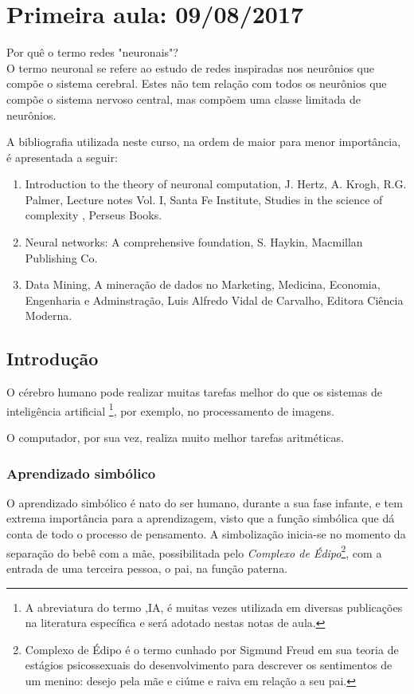 \section{Primeira aula: 09/08/2017 }
\onehalfspacing

Por quê o termo redes "neuronais"?\\
O termo neuronal se refere ao estudo de redes inspiradas nos neurônios que compõe o sistema cerebral.  Estes não tem relação com todos os neurônios que compõe o sistema nervoso central, mas compõem uma classe limitada de neurônios. 

A bibliografia utilizada neste curso, na ordem de maior para menor importância, é apresentada a seguir:

\begin{enumerate}
	\item Introduction to the theory of neuronal computation, J. Hertz, A. Krogh, R.G. Palmer, Lecture notes Vol. I, Santa Fe Institute, Studies in the science of complexity , Perseus Books.
	\item Neural networks: A comprehensive foundation, S. Haykin, Macmillan Publishing Co.
	\item Data Mining, A mineração de dados no Marketing, Medicina, Economia, Engenharia e Adminstração, Luis Alfredo Vidal de Carvalho, Editora Ciência Moderna.     
\end{enumerate}

\subsection{Introdução}

O cérebro humano pode realizar muitas tarefas melhor do que os sistemas de inteligência artificial \footnote{A abreviatura do termo ,IA,  é muitas vezes utilizada em diversas publicações na literatura específica e será adotado nestas notas de aula. }, por exemplo, no processamento de imagens.

O computador, por sua vez, realiza muito melhor tarefas aritméticas. 

\subsubsection{Aprendizado simbólico}

O aprendizado simbólico é nato do ser humano, durante a sua fase infante, e tem extrema importância para a aprendizagem, visto que a função simbólica que dá conta de todo o processo de pensamento. A simbolização inicia-se no momento da separação do bebê com a mãe, possibilitada pelo \textit{Complexo de Édipo}\footnote{Complexo de Édipo é o termo cunhado por Sigmund Freud em sua teoria de estágios psicossexuais do desenvolvimento para descrever os sentimentos de um menino: desejo pela mãe e ciúme e raiva em relação a seu pai.}, com a entrada de uma terceira pessoa, o pai, na função paterna. 

